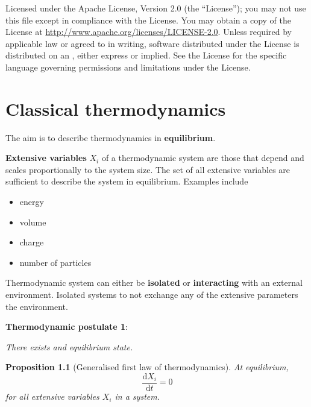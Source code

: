 \documentclass[letter-paper]{tufte-book}
\newtheorem{proposition}[theorem]{\color{pastel-blue}Proposition}
\newcommand\Def[1]{\textbf{#1}}
\begin{document}
\begin{fullwidth}
\par

\par Licensed under the Apache License, Version 2.0 (the ``License''); you may not
use this file except in compliance with the License. You may obtain a copy
of the License at \url{http://www.apache.org/licenses/LICENSE-2.0}. Unless
required by applicable law or agreed to in writing, software distributed
under the License is distributed on an , either express or implied. See the
License for the specific language governing permissions and limitations
under the License.
\end{fullwidth}


\chapter{Classical thermodynamics}

The aim is to describe thermodynamics in \Def{equilibrium}.

\Def{Extensive variables} $X_i$ of a thermodynamic system are those that depend
and scales proportionally to the system size. The set of all extensive variables
are sufficient to describe the system in equilibrium. Examples include
\begin{itemize}
  \item energy
  \item volume
  \item charge
  \item number of particles
\end{itemize}

Thermodynamic system can either be \Def{isolated} or \Def{interacting} with an
external environment. Isolated systems to not exchange any of the extensive
parameters the environment.

\vspace*{3mm}

\Def{Thermodynamic postulate 1}:

\begin{center}\textit{There exists and equilibrium state.}\end{center}

\begin{proposition}[Generalised first law of thermodynamics]
At equilibrium,
\begin{equation}
  \frac{\mathrm{d}X_i}{\mathrm{d}t} = 0
\end{equation}
for all extensive variables $X_i$ in a system.
\end{proposition}
\end{document}
